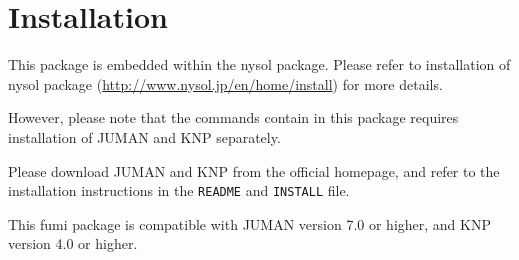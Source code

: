 
%

\section{Installation\label{sect:install}}

This package is embedded within the nysol package. 
Please refer to installation of nysol package (\url{http://www.nysol.jp/en/home/install}) for more details. 

However, please note that the commands contain in this package requires installation of JUMAN and KNP separately. 

Please download JUMAN and KNP from the official homepage, and refer to the installation instructions  in the \verb|README|  and \verb|INSTALL| file.  

This fumi package is compatible with  JUMAN version 7.0 or higher, and KNP version 4.0 or higher. 


